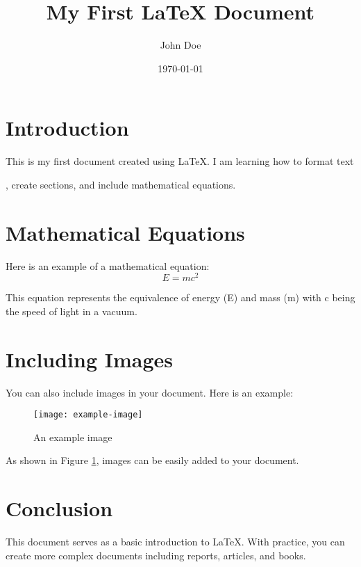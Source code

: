 \documentclass{article}
\title{My First LaTeX Document}
\author{John Doe}
\date{\today}
\begin{document}
    


\maketitle  
\tableofcontents
\newpage
\section{Introduction}
This is my first document created using \LaTeX. I am learning how to format text


, create sections, and include mathematical equations.




\section{Mathematical Equations}


Here is an example of a mathematical equation:
\begin{equation}
E = mc^2
\end{equation}

This equation represents the equivalence of energy (E) and mass (m) with c being
the speed of light in a vacuum.


\section{Including Images}
You can also include images in your document. Here is an example:

\begin{figure}[h!]    
\centering
\texttt{[image: example-image]}
\caption{An example image}
\label{fig:example}
\end{figure}
As shown in Figure \ref{fig:example}, images can be easily added to your document.

\section{Conclusion}
This document serves as a basic introduction to \LaTeX. With practice, you can create
more complex documents including reports, articles, and books.
\end{document}
